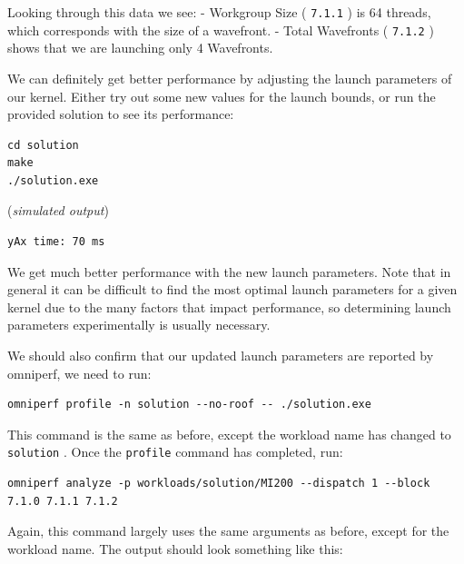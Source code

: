 \documentclass[
]{article}
\let\oldtexttt\texttt
\renewcommand{\texttt}[1]{
  \colorbox{Light}{\oldtexttt{#1}}
}
\begin{document}
Looking through this data we see: - Workgroup Size (\texttt{7.1.1}) is
64 threads, which corresponds with the size of a wavefront. - Total
Wavefronts (\texttt{7.1.2}) shows that we are launching only 4
Wavefronts.

We can definitely get better performance by adjusting the launch
parameters of our kernel. Either try out some new values for the launch
bounds, or run the provided solution to see its performance:

\begin{verbatim}
cd solution
make
./solution.exe
\end{verbatim}

(\emph{simulated output})

\begin{verbatim}
yAx time: 70 ms
\end{verbatim}

We get much better performance with the new launch parameters. Note that
in general it can be difficult to find the most optimal launch
parameters for a given kernel due to the many factors that impact
performance, so determining launch parameters experimentally is usually
necessary.

We should also confirm that our updated launch parameters are reported
by omniperf, we need to run:

\begin{verbatim}
omniperf profile -n solution --no-roof -- ./solution.exe
\end{verbatim}

This command is the same as before, except the workload name has changed
to \texttt{solution}. Once the \texttt{profile} command has completed,
run:

\begin{Verbatim}
omniperf analyze -p workloads/solution/MI200 --dispatch 1 --block 7.1.0 7.1.1 7.1.2
\end{Verbatim}

Again, this command largely uses the same arguments as before, except
for the workload name. The output should look something like this:
\end{document}
